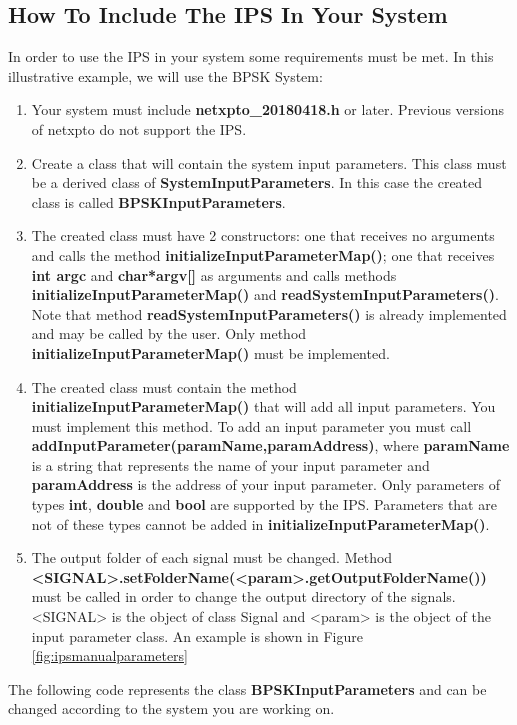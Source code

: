 \subsection{How To Include The IPS In Your System}
In order to use the IPS in your system some requirements must be met. In this illustrative example, we will use the BPSK System:
\begin{enumerate}
\item Your system must include \textbf{netxpto\_20180418.h} or later. Previous versions of netxpto do not support the IPS.
\item Create a class that will contain the system input parameters. This class must be a derived class of \textbf{SystemInputParameters}. In this case the created class is called \textbf{BPSKInputParameters}.
\item The created class must have 2 constructors: one that receives no arguments and calls the method \textbf{initializeInputParameterMap()}; one that receives \textbf{int argc} and \textbf{char*argv[]} as arguments and calls methods \textbf{initializeInputParameterMap()} and \textbf{readSystemInputParameters()}. Note that method \textbf{readSystemInputParameters()} is already implemented and may be called by the user. Only method \textbf{initializeInputParameterMap()} must be implemented.
\item The created class must contain the method \textbf{initializeInputParameterMap()} that will add all input parameters.
You must implement this method. To add an input parameter you must call \textbf{addInputParameter(paramName,paramAddress)}, where \textbf{paramName} is a string that represents the name of your input parameter and \textbf{paramAddress} is the address of your input parameter. Only parameters of types \textbf{int}, \textbf{double} and \textbf{bool} are supported by the IPS. Parameters that are not of these types cannot be added in \textbf{initializeInputParameterMap()}.
\item The output folder of each signal must be changed. Method \textbf{<SIGNAL>.setFolderName(<param>.getOutputFolderName())} must be called in order to change the output directory of the signals. <SIGNAL> is the object of class Signal and <param> is the object of the input parameter class. An example is shown in Figure \ref{fig:ipsmanualparameters}
\end{enumerate}
\pagebreak
The following code represents the class \textbf{BPSKInputParameters} and can be changed according to the system you are working on.
